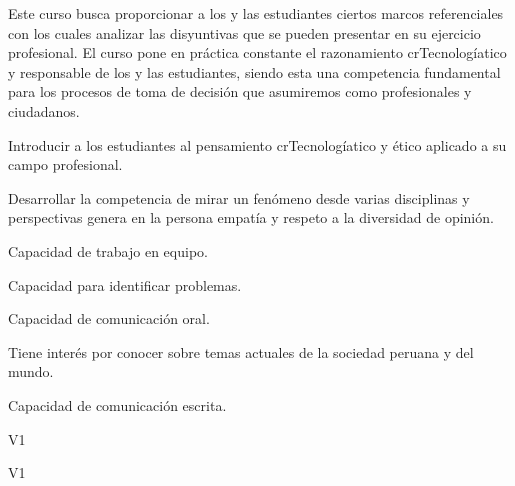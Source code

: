 \begin{syllabus}


\begin{justification}
Este curso busca proporcionar a los y las estudiantes ciertos marcos referenciales con los cuales analizar las disyuntivas que se pueden presentar en su ejercicio profesional. 
El curso pone en práctica constante el razonamiento crTecnologíatico y responsable de los  y las estudiantes, siendo esta una competencia fundamental para los procesos de toma de decisión que asumiremos como profesionales y ciudadanos.
\end{justification}
\begin{goals}
\item Introducir a los estudiantes al pensamiento crTecnologíatico y ético aplicado a su campo profesional.
\item Desarrollar la competencia de mirar un fenómeno desde varias disciplinas y perspectivas genera en la persona empatía y respeto a la diversidad de opinión.
\item Capacidad de trabajo en equipo.
\item Capacidad para identificar problemas.
\item Capacidad de comunicación oral.
\item Tiene interés por conocer sobre temas actuales de la sociedad peruana y del mundo.
\item Capacidad de comunicación escrita.
\end{goals}

\begin{outcomes}{V1}
    \item {}
    \item {}
    \item {}
    \item {}
    \item {}
\end{outcomes}

\begin{competences}{V1}
    \item {}
    \item {}
    \item {}
    \item {}
\end{competences}


\end{syllabus}
